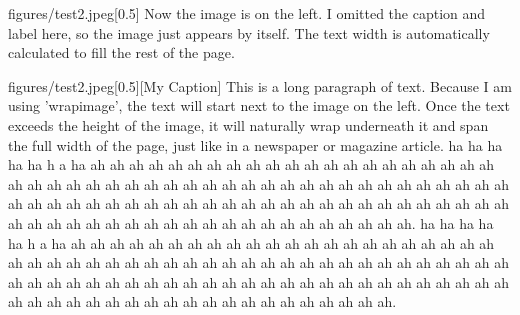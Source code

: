 \begin{sidebyimage}[l]{figures/test2.jpeg}[0.5\textwidth]
    Now the image is on the left. I omitted the caption and label here, 
    so the image just appears by itself. The text width is automatically 
    calculated to fill the rest of the page.
\end{sidebyimage}

\begin{wrapimage}[r]{figures/test2.jpeg}[0.5\textwidth][My Caption]
    This is a long paragraph of text. Because I am using 'wrapimage', 
    the text will start next to the image on the left. Once the text 
    exceeds the height of the image, it will naturally wrap underneath 
    it and span the full width of the page, just like in a newspaper 
    or magazine article. ha ha ha ha ha h a ha ah ah ah ah ah ah ah ah ah ah ah ah ah ah ah ah ah ah ah ah ah ah ah ah ah ah ah ah ah ah ah ah ah ah ah ah ah ah ah ah ah ah ah ah ah ah ah ah ah ah ah ah ah ah ah ah ah ah ah ah ah ah ah ah ah ah ah ah ah ah ah ah ah ah ah ah ah ah ah ah ah ah ah ah ah ah ah ah ah ah ah ah ah ah. ha ha ha ha ha h a ha ah ah ah ah ah ah ah ah ah ah ah ah ah ah ah ah ah ah ah ah ah ah ah ah ah ah ah ah ah ah ah ah ah ah ah ah ah ah ah ah ah ah ah ah ah ah ah ah ah ah ah ah ah ah ah ah ah ah ah ah ah ah ah ah ah ah ah ah ah ah ah ah ah ah ah ah ah ah ah ah ah ah ah ah ah ah ah ah ah ah ah ah ah ah. 
\end{wrapimage}